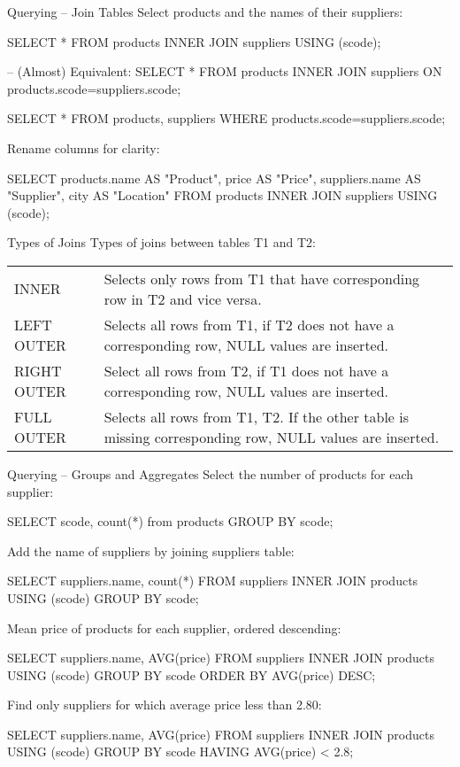 \documentclass[ignorenonframetext,xcolor=x11names]{beamer}
\begin{document}
\begin{frame}[fragile]{Querying -- Join Tables}
Select products and the names of their suppliers:
\begin{sqlcode}
SELECT * FROM products INNER JOIN suppliers USING (scode);

-- (Almost) Equivalent:
SELECT * FROM products 
    INNER JOIN suppliers ON products.scode=suppliers.scode;

SELECT * FROM products, suppliers 
    WHERE products.scode=suppliers.scode;
\end{sqlcode}
Rename columns for clarity:
\begin{sqlcode}
SELECT products.name AS "Product", 
       price AS "Price", 
       suppliers.name AS "Supplier", 
       city AS "Location"
    FROM products INNER JOIN suppliers USING (scode);
\end{sqlcode}
\end{frame}

\begin{frame}{Types of Joins}
\renewcommand{\arraystretch}{1.5}
Types of joins between tables T1 and T2: \\

\small
\begin{tabularx}{\textwidth}{l|X} \hline
INNER & Selects only rows from T1 that have corresponding row in T2 and vice versa. \\
LEFT OUTER & Selects all rows from T1, if T2 does not have a corresponding row, NULL values are inserted. \\
RIGHT OUTER & Select all rows from T2, if T1 does not have a corresponding row, NULL values are inserted. \\
FULL OUTER & Selects all rows from T1, T2. If the other table is missing corresponding row, NULL values are inserted. \\ \hline
\end{tabularx}
\end{frame}


\begin{frame}[fragile]{Querying -- Groups and Aggregates}
Select the number of products for each supplier:
\begin{sqlcode}
SELECT scode, count(*) from products GROUP BY scode;
\end{sqlcode}
Add the name of suppliers by joining suppliers table:
\begin{sqlcode}
SELECT suppliers.name, count(*)
    FROM suppliers INNER JOIN products USING (scode)
    GROUP BY scode;
\end{sqlcode}
Mean price of products for each supplier, ordered descending:
\begin{sqlcode}
SELECT suppliers.name, AVG(price)
    FROM suppliers INNER JOIN products USING (scode)
    GROUP BY scode
    ORDER BY AVG(price) DESC;
\end{sqlcode}
Find only suppliers for which average price less than 2.80:
\begin{sqlcode}
SELECT suppliers.name, AVG(price)
    FROM suppliers INNER JOIN products USING (scode)
    GROUP BY scode
    HAVING AVG(price) < 2.8;
\end{sqlcode}
\end{frame}
\end{document}
